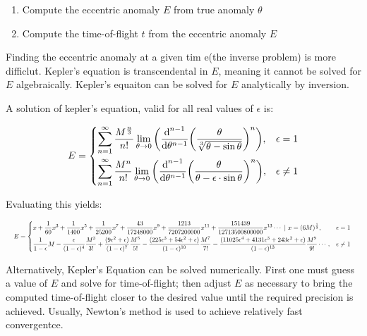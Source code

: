 \documentclass[12pt]{article}
\begin{document}
\begin{enumerate}
  \item Compute the eccentric anomaly \(E\) from true anomaly \(\theta\)
  \item Compute the time-of-flight \(t\) from the eccentric anomaly \(E\)
\end{enumerate}

Finding the eccentric anomaly at a given tim e(the inverse problem) is more difficlut. Kepler's equation is transcendental in \(E\), meaning it cannot be solved for \(E\) algebraically. Kepler's equaiton can be solved for \(E\) analytically by inversion.

A solution of kepler's equation, valid for all real values of \(\epsilon\) is:

\begin{align*}
  E=\begin{dcases}
  \sum\limits_{n=1}^{\infty} {\frac{M^{\frac{n}{3}}}{n!}} \lim\limits_{\theta \to 0} {\left(\frac{\text{d}^{n-1}}{\text{d}\theta^{n-1}} {\left(\frac{\theta}{\sqrt[3]{\theta-\sin\theta}}\right)}^{n}\right)} , & \epsilon = 1 \\
  \sum\limits_{n=1}^{\infty} {\frac{M^{n}}{n!}} \lim\limits_{\theta \to 0} {\left(\frac{\text{d}^{n-1}}{\text{d}\theta^{n-1}} {\left(\frac{\theta}{\theta-\epsilon \cdot \sin \theta}\right)}^{n}\right)} , & \epsilon \ne 1
  \end{dcases}
\end{align*}

Evaluating this yields:

\begin{displaymath}
  \hspace*{-0.0 \textwidth} \resizebox{ 1.0 \textwidth}{!}{$E=\begin{dcases} x + \frac{1}{60} x^3 + \frac{1}{1400} x^5 + \frac{1}{25200} x^7 + \frac{43}{17248000}x^9 + \frac{1213}{7207200000} x^{11} + \frac{151439}{12713500800000} x^{13} \cdots \ | \ x=(6M)^\frac{1}{3} , & \epsilon = 1 \\ \frac{1}{1-\epsilon}M-\frac{\epsilon}{(1-\epsilon)^4}\frac{M^3}{3!} + \frac{(9\epsilon^2+\epsilon)}{(1-\epsilon)^7}\frac{M^5}{5!} - \frac{(225\epsilon^3+54\epsilon^2+\epsilon)}{(1-\epsilon)^{10}}\frac{M^7}{7!} = \frac{(11025\epsilon^4 + 4131\epsilon^3+243\epsilon^2+\epsilon)}{(1-\epsilon)^{13}}\frac{M^9}{9!} \cdots , & \epsilon \ne 1 \end{dcases} $
    }
\end{displaymath}

Alternatively, Kepler's Equation can be solved numerically. First one must guess a value of \(E\) and solve for time-of-flight; then adjust \(E\) as necessary to bring the computed time-of-flight closer to the desired value until the required precision is achieved. Usually, Newton's method is used to achieve relatively fast convergentce.
\end{document}
